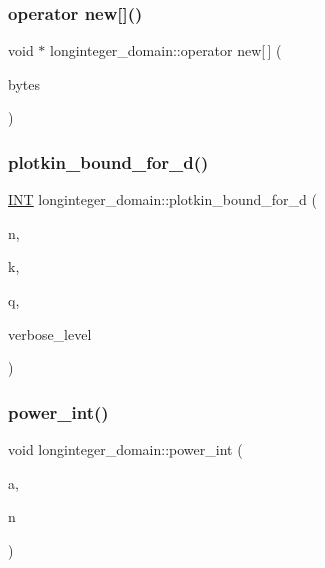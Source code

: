 \subsubsection{\texorpdfstring{operator new[]()}{operator new[]()}}
{\footnotesize\ttfamily void $\ast$ longinteger\+\_\+domain\+::operator new\mbox{[}$\,$\mbox{]} (\begin{DoxyParamCaption}\item[{size\+\_\+t}]{bytes }\end{DoxyParamCaption})}

\mbox{\label{classlonginteger__domain_ad8c2e4994b290f8ddf97e431f613e9da}} 
\subsubsection{\texorpdfstring{plotkin\+\_\+bound\+\_\+for\+\_\+d()}{plotkin\_bound\_for\_d()}}
{\footnotesize\ttfamily \mbox{\hyperlink{galois_8h_a09fddde158a3a20bd2dcadb609de11dc}{I\+NT}} longinteger\+\_\+domain\+::plotkin\+\_\+bound\+\_\+for\+\_\+d (\begin{DoxyParamCaption}\item[{\mbox{\hyperlink{galois_8h_a09fddde158a3a20bd2dcadb609de11dc}{I\+NT}}}]{n,  }\item[{\mbox{\hyperlink{galois_8h_a09fddde158a3a20bd2dcadb609de11dc}{I\+NT}}}]{k,  }\item[{\mbox{\hyperlink{galois_8h_a09fddde158a3a20bd2dcadb609de11dc}{I\+NT}}}]{q,  }\item[{\mbox{\hyperlink{galois_8h_a09fddde158a3a20bd2dcadb609de11dc}{I\+NT}}}]{verbose\+\_\+level }\end{DoxyParamCaption})}

\mbox{\label{classlonginteger__domain_adcc45b3b48746fa78c20881cd2553ab6}} 
\subsubsection{\texorpdfstring{power\+\_\+int()}{power\_int()}}
{\footnotesize\ttfamily void longinteger\+\_\+domain\+::power\+\_\+int (\begin{DoxyParamCaption}\item[{\mbox{\hyperlink{classlonginteger__object}{longinteger\+\_\+object}} \&}]{a,  }\item[{\mbox{\hyperlink{galois_8h_a09fddde158a3a20bd2dcadb609de11dc}{I\+NT}}}]{n }\end{DoxyParamCaption})}

